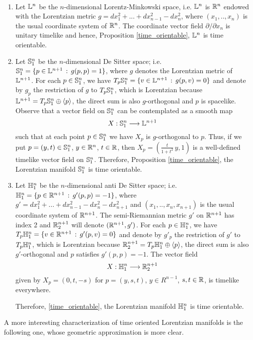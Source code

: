 \begin{example}
	~		
	\begin{enumerate}
		\item Let $\L^n$ be the $n$-dimensional Lorentz-Minkowski space, i.e. $\L^n$ is $\R^n$ endowed with the Lorentzian metric $g=dx_1^2+...+dx_{n-1}^2-dx_n^2$, where $(x_1,..,x_n)$ is the usual coordinate system of $\R^n$. The coordinate vector field $\partial/\partial x_n$ is unitary timelike and hence, Proposition \ref{time_orientable}, $\L ^n$ is time orientable.
		\item Let $\S_1^n$ be the $n$-dimensional De Sitter space; i.e. $\S_1^n =\{p \in \L^{n+1} \, :\, g(p,p)=1 \}$, where $g$ denotes the Lorentzian metric of $\L^{n+1}$. For each $p \in \S_1^n$, we have $T_p\S_1^n=\{v \in \L^{n+1} \, : \, g(p,v)=0\}$
		and denote by $g_p$ the restriction of $g$ to $T_p\S_1^n$, which is Lorentzian because $\L^{n+1}=T_p\S_1^n \oplus \langle p \rangle$, the direct sum is also $g$-orthogonal and $p$ is spacelike. Observe that a vector field on $\S_1^n$ can be contemplated as a smooth map
		\[
		X : \S_1^n \longrightarrow \L^{n+1}
		\]
		such that at each point $p \in \S_1^n$ we have $X_p$ is $g$-orthogonal to $p$. Thus, if we put $p=(y,t)\in \S_1^n$, $y \in \R^n$, $t \in \R$, then $X_p=(\frac{t}{1+t^2}\,y,1)$ is a well-defined timelike vector field on $\S_1^n$. Therefore, Proposition \ref{time_orientable}, the Lorentzian manifold $\S_1^n$ is time orientable.
		\item Let $\H_1^n$ be the $n$-dimensional anti De Sitter space; i.e. $\H_1^n =\{p \in \R^{n+1} \, :\, g'(p,p)=-1 \}$, where $g'=dx_1^2+...+dx_{n-1}^2-dx_n^2-dx_{n+1}^2$ and $(x_1,..,x_n,x_{n+1})$ is the usual coordinate system of $\R^{n+1}$. The semi-Riemannian metric $g'$ on $\R^{n+1}$ has index 2 and $\R^{n+1}_2$ will denote $(\R^{n+1},g')$. For each $p \in \H_1^n$, we have $T_p\H_1^n=\{v \in \R^{n+1} \, : \, g'(p,v)=0\}$ and denote by $g'_p$ the restriction of $g'$ to $T_p\H_1^n$, which is Lorentzian because $\R^{n+1}_2=T_p\H_1^n \oplus \langle p \rangle$, the direct sum is also $g'$-orthogonal and $p$ satisfies $g'(p,p)=-1$. The vector field
		\[
		X : \H_1^n \longrightarrow \R^{n+1}_2
		\]
		given by $X_p=(0,t,-s)$ for $p=(y,s,t)$, $y \in R^{n-1}$, $s,t\in \R$, is timelike everywhere.
		
		Therefore, \autoref{time_orientable}, the Lorentzian manifold $\H_1^n$ is time orientable.
	\end{enumerate}
\end{example}

A more interesting characterization of time oriented Lorentzian manifolds is the following one, whose geometric approximation is more clear.

